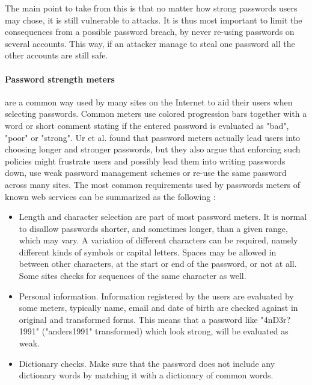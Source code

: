 \par The main point to take from this is that no matter how strong passwords users may chose, it is still vulnerable to attacks. It is thus most important to limit the consequences from a possible password breach, by never re-using passwords on several accounts. This way, if an attacker manage to steal one password all the other accounts are still safe. 

\paragraph{Password strength meters} are a common way used by many sites on the Internet to aid their users when selecting passwords. Common meters use colored progression bars together with a word or short comment stating if the entered password is evaluated as "bad", "poor" or "strong". Ur et al. \cite{password-meters2} found that password meters actually lead users into choosing longer and stronger passwords, but they also argue that enforcing such policies might frustrate users and possibly lead them into writing passwords down, use weak password management schemes or re-use the same password across many sites. The most common requirements used by passwords meters of known web services can be summarized as the following \cite{password-meters}:
\begin{itemize}
    \item{Length and character selection} are part of most password meters. It is normal to disallow passwords shorter, and sometimes longer, than a given range, which may vary. A variation of different characters can be required, namely different kinds of symbols or capital letters. Spaces may be allowed in between other characters, at the start or end of the password, or not at all. Some sites checks for sequences of the same character as well.
    \item{Personal information.} Information registered by the users are evaluated by some meters, typically name, email and date of birth are checked against in original and transformed forms. This means that a password like "4nD3r?1991" ("anders1991" transformed) which look strong, will be evaluated as weak.
    \item{Dictionary checks.} Make sure that the password does not include any dictionary words by matching it with a dictionary of common words. 
\end{itemize}

%

